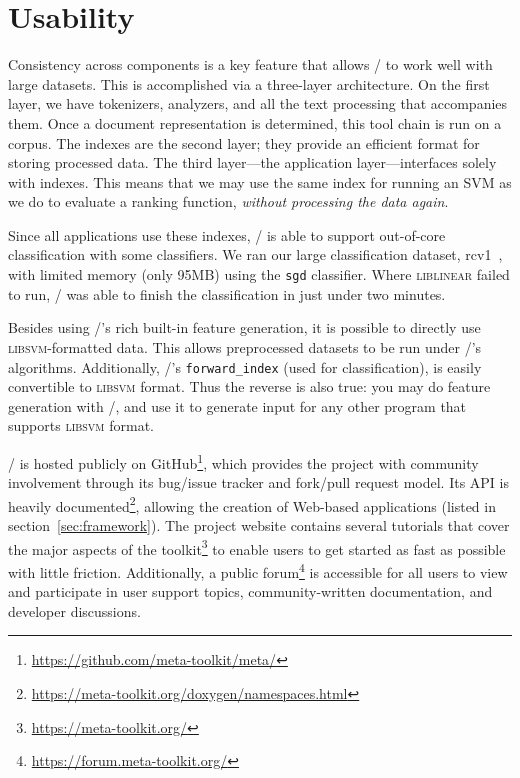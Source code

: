 \section{Usability}

Consistency across components is a key feature that allows \meta/ to work
well with large datasets. This is accomplished via a three-layer architecture.
On the first layer, we have tokenizers, analyzers, and all the text processing
that accompanies them. Once a document representation is determined, this tool
chain is run on a corpus. The indexes are the second layer; they provide an
efficient format for storing processed data. The third layer---the application
layer---interfaces solely with indexes. This means that we may use the same
index for running an SVM as we do to evaluate a ranking function, \emph{without
processing the data again}.

Since all applications use these indexes, \meta/ is able to support
out-of-core classification with some classifiers. We ran our large
classification dataset, rcv1~\cite{rcv1}, with limited memory (only 95MB) using
the \texttt{sgd} classifier.
Where \textsc{liblinear} failed to run,
\meta/ was able to finish the classification in just under two minutes.

Besides using \meta/'s rich built-in feature generation, it is possible to
directly use \textsc{libsvm}-formatted data. This allows preprocessed datasets
to be run under \meta/'s algorithms. Additionally, \meta/'s
\texttt{forward\_index} (used for classification), is easily convertible to
\textsc{libsvm} format. Thus the reverse is also true: you may do feature
generation with \meta/, and use it to generate input for any other program that
supports \textsc{libsvm} format.

\meta/ is hosted publicly on
GitHub\footnote{\url{https://github.com/meta-toolkit/meta/}}, which provides the
project with community involvement through its bug/issue tracker and fork/pull
request model. Its API is heavily
documented\footnote{\url{https://meta-toolkit.org/doxygen/namespaces.html}},
allowing the creation of Web-based applications (listed in
section~\ref{sec:framework}). The project website contains several tutorials
that cover the major aspects of the
toolkit\footnote{\url{https://meta-toolkit.org/}} to enable users to get started
as fast as possible with little friction. Additionally, a public
forum\footnote{\url{https://forum.meta-toolkit.org/}} is accessible for all
users to view and participate in user support topics, community-written
documentation, and developer discussions.

